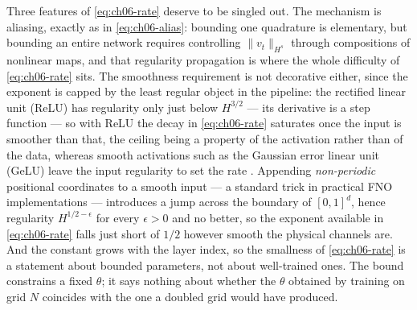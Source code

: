 Three features of \eqref{eq:ch06-rate} deserve to be singled out. The mechanism is
aliasing, exactly as in \eqref{eq:ch06-alias}: bounding one quadrature is
elementary, but bounding an entire network requires controlling
$\|v_t\|_{H^s}$ through compositions of nonlinear maps, and that regularity
propagation is where the whole difficulty of \eqref{eq:ch06-rate} sits.
The smoothness requirement is not decorative either, since the exponent is
capped by the least regular object in the pipeline: the rectified linear unit
(ReLU) has regularity only just below $H^{3/2}$ --- its derivative is a step
function --- so with ReLU the decay in \eqref{eq:ch06-rate} saturates once the
input is smoother than that, the ceiling being a property of the activation
rather than of the data, whereas smooth activations such as the Gaussian error
linear unit (GeLU) leave the input regularity to set the rate
.
Appending \emph{non-periodic} positional coordinates to a smooth input --- a
standard trick in practical FNO implementations --- introduces a jump across the
boundary of $[0,1]^d$, hence regularity $H^{1/2-\epsilon}$ for every
$\epsilon>0$ and no better, so the exponent available in \eqref{eq:ch06-rate}
falls just short of $1/2$ however smooth the physical channels are.
And the constant grows with the layer index, so the smallness of
\eqref{eq:ch06-rate} is a statement about bounded parameters, not about
well-trained ones. The bound constrains a fixed $\theta$; it says nothing
about whether the $\theta$ obtained by training on grid $N$ coincides with the
one a doubled grid would have produced.

